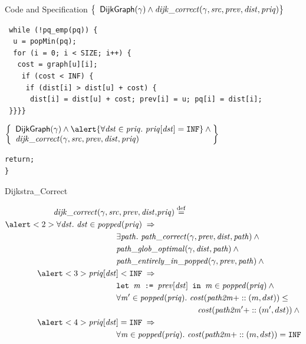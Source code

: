\documentclass[usenames, xcolor=dvipsnames]{beamer}
\makeatletter
\newcommand{\ifty}{\texttt{INF}}
\newcommand{\defeq}{\mathbin{\overset{\mathrm{def}}{=}}}
\newcommand{\braces}[1]{\left\{\begin{array}{l@{}} #1 \end{array}\right\}}
\newcommand{\m}[1]{\ensuremath{\mathit{#1}}} %
\newcommand{\p}[1]{\ensuremath{\mathsf{#1}}} %
\makeatother
\begin{document}
\begin{frame}[fragile]{Code and Specification}
$\braces{\p{DijkGraph}(\gamma) \wedge \m{dijk\_correct}(\gamma,\m{src},\m{prev},\m{dist},\m{priq})}$
\pause
\begin{Verbatim}
 while (!pq_emp(pq)) {
  u = popMin(pq);
  for (i = 0; i < SIZE; i++) {
   cost = graph[u][i]; 
    if (cost < INF) {
     if (dist[i] > dist[u] + cost) {
      dist[i] = dist[u] + cost; prev[i] = u; pq[i] = dist[i];
 }}}}
\end{Verbatim}
\pause
$\braces{\p{DijkGraph}(\gamma) \wedge 
\alert{\forall \m{dst} \in \m{priq}.~\m{priq}[\m{dst}] = \texttt{INF}} \wedge \null \\ 
\m{dijk\_correct}(\gamma,\m{src},\m{prev},\m{dist},\m{priq})}$
\begin{Verbatim}
return;
}
\end{Verbatim}
\end{frame}

\begin{frame}{Dijkstra\_Correct}

\begin{equation*}
\begin{split}
\m{dijk\_correct}(\gamma, \m{src}, \m{prev}, \m{dist},& \m{priq}) \; \defeq \; \\
\alert<2>{\forall \m{dst}.~\m{dst} \in \m{popped}(\m{priq}) \; \Rightarrow} \; & \\ 
& \hspace{-5em} \exists \m{path}.~\m{path\_correct}(\gamma, \m{prev}, \m{dist}, \m{path}) \wedge \null \\
& \hspace{-5em} \m{path\_glob\_optimal}(\gamma, \m{dist}, \m{path}) \wedge \null \\
& \hspace{-5em} \m{path\_entirely\_in\_popped}(\gamma, \m{prev}, \m{path}) \wedge \null \\
\alert<3>{\m{priq}[\m{dst}] < \ifty \; \Rightarrow} \; & \\ 
& \hspace{-5em} \texttt{let }\m{m} \texttt{ := } \m{prev}[\m{dst}] \texttt{ in } \m{m} \in \m{popped}(\m{priq}) \wedge \null \\
& \hspace{-5em} \forall \m{m'} \in \m{popped}(\m{priq}).~\m{cost}(\m{path2m} +:: (m, dst)) \le \null \\
& \hspace{-5em} \hspace{10em} \m{cost}(\m{path2m'} +:: (m', dst)) \wedge \null \\
\alert<4>{\m{priq}[\m{dst}] = \ifty \; \Rightarrow} \; & \\ 
& \hspace{-5em} \forall \m{m} \in \m{popped}(\m{priq}).~\m{cost}(\m{path2m} +:: (m, dst)) = \ifty
\end{split}
\end{equation*}

\end{frame}
\end{document}
